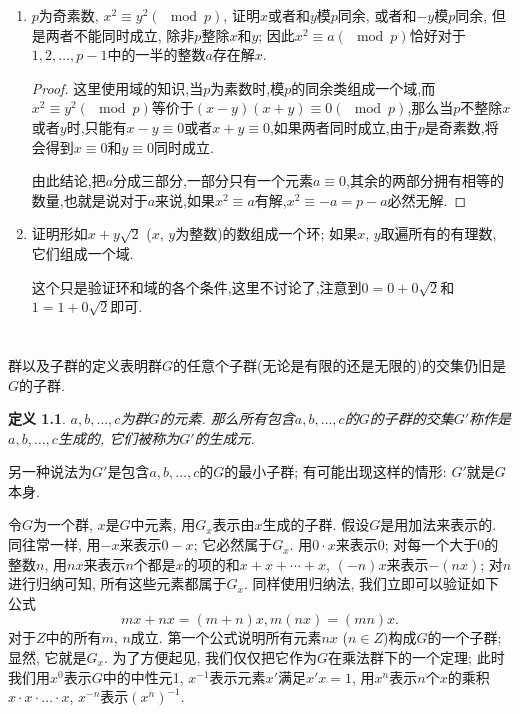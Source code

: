 \documentclass[12pt,a4paper]{book} %
\newtheorem{definition}[theorem]{定义}
\theoremstyle{remark}
\theoremstyle{example}
\theoremstyle{lemma}
\theoremstyle{corollary}
\numberwithin{theorem}{chapter}
\begin{document}
\begin{enumerate}
\item $p$为奇素数, $x^2 \equiv y^2(\mod p)$, 证明$x$或者和$y$模$p$同余, 或者和$-y$模$p$同余, 但是两者不能同时成立, 除非$p$整除$x$和$y$; 因此$x^2 \equiv a (\mod p)$恰好对于$1, 2, \ldots, p - 1$中的一半的整数$a$存在解$x$.

\begin{proof}
这里使用域的知识,当$p$为素数时,模$p$的同余类组成一个域,而$x^2 \equiv y^2(\mod{p})$等价于$(x-y)(x+y) \equiv 0(\mod{p})$,那么当$p$不整除$x$或者$y$时,只能有$x-y \equiv 0$或者$x+y \equiv 0$,如果两者同时成立,由于$p$是奇素数,将会得到$x \equiv 0$和$y \equiv 0$同时成立.

由此结论,把$a$分成三部分,一部分只有一个元素$a \equiv 0$,其余的两部分拥有相等的数量,也就是说对于$a$来说,如果$x^2 \equiv a$有解,$x^2 \equiv -a = p-a$必然无解.
\end{proof}

\item 证明形如$x + y \sqrt{2}$ ($x$, $y$为整数)的数组成一个环; 如果$x$, $y$取遍所有的有理数, 它们组成一个域.

这个只是验证环和域的各个条件,这里不讨论了,注意到$0=0+0\sqrt{2}$和$1=1+0\sqrt{2}$即可.
\end{enumerate}

\chapter{} \label{chapter:7}
群以及子群的定义表明群$G$的任意个子群(无论是有限的还是无限的)的交集仍旧是$G$的子群.

\begin{definition} \label{def:VII_1}
$a, b, \ldots, c$为群$G$的元素. 那么所有包含$a, b, \ldots, c$的$G$的子群的交集$G'$称作是$a, b, \ldots, c$生成的, 它们被称为$G'$的生成元.
\end{definition}

另一种说法为$G'$是包含$a, b, \ldots, c$的$G$的最小子群; 有可能出现这样的情形: $G'$就是$G$本身.

令$G$为一个群, $x$是$G$中元素, 用$G_x$表示由$x$生成的子群. 假设$G$是用加法来表示的. 同往常一样, 用$-x$来表示$0 - x$; 它必然属于$G_x$. 用$0 \cdot x$来表示$0$; 对每一个大于0的整数$n$, 用$nx$来表示$n$个都是$x$的项的和$x + x + \cdots + x$, $(-n)x$来表示$-(nx)$; 对$n$进行归纳可知, 所有这些元素都属于$G_x$. 同样使用归纳法, 我们立即可以验证如下公式
\[
mx + nx = (m + n)x, m(nx) = (mn)x.
\]
对于$Z$中的所有$m$, $n$成立. 第一个公式说明所有元素$nx$ ($n \in Z$)构成$G$的一个子群; 显然, 它就是$G_x$. 为了方便起见, 我们仅仅把它作为$G$在乘法群下的一个定理; 此时我们用$x^0$表示$G$中的中性元1, $x^{-1}$表示元素$x'$满足$x'x = 1$, 用$x^n$表示$n$个$x$的乘积$x \cdot x \cdot \ldots \cdot x$, $x^{-n}$表示$(x^n)^{-1}$.
\end{document}

